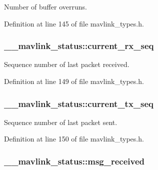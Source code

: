 Number of buffer overruns. 



Definition at line 145 of file mavlink\-\_\-types.\-h.

\hypertarget{struct____mavlink__status_affbdd32b3dff8ae35327a79ed6b17646}{
\subsubsection[{current\-\_\-rx\-\_\-seq}]{ \-\_\-\-\_\-mavlink\-\_\-status\-::current\-\_\-rx\-\_\-seq}}\label{struct____mavlink__status_affbdd32b3dff8ae35327a79ed6b17646}


Sequence number of last packet received. 



Definition at line 149 of file mavlink\-\_\-types.\-h.

\hypertarget{struct____mavlink__status_a06482d6c3fbfa829526c9b2e2e895f32}{
\subsubsection[{current\-\_\-tx\-\_\-seq}]{ \-\_\-\-\_\-mavlink\-\_\-status\-::current\-\_\-tx\-\_\-seq}}\label{struct____mavlink__status_a06482d6c3fbfa829526c9b2e2e895f32}


Sequence number of last packet sent. 



Definition at line 150 of file mavlink\-\_\-types.\-h.

\hypertarget{struct____mavlink__status_a183576e45facc9da8123b7866d458680}{
\subsubsection[{msg\-\_\-received}]{ \-\_\-\-\_\-mavlink\-\_\-status\-::msg\-\_\-received}}\label{struct____mavlink__status_a183576e45facc9da8123b7866d458680}


